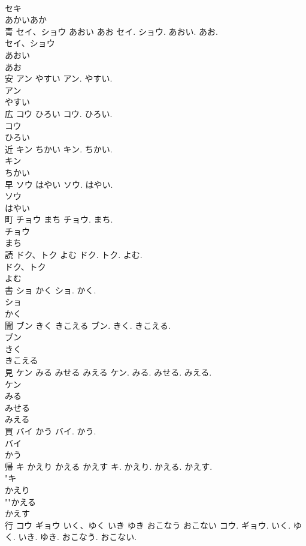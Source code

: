 \documentclass[8pt]{extreport}
\begin{document}
\begin{CJK}{UTF8}{min}
\\	セキ
\\	あかいあか
\\	青	セイ、ショウ あおい あお	セイ. ショウ. あおい. あお.	
\\	セイ、ショウ
\\	あおい
\\	あお
\\	安	アン やすい	アン. やすい.	
\\	アン
\\	やすい
\\	広	コウ ひろい	コウ. ひろい.	
\\	コウ
\\	ひろい
\\	近	キン ちかい	キン. ちかい.	
\\	キン
\\	ちかい
\\	早	ソウ はやい	ソウ. はやい.	
\\	ソウ
\\	はやい
\\	町	チョウ まち	チョウ. まち.	
\\	チョウ
\\	まち
\\	読	ドク、トク よむ	ドク. トク. よむ.	
\\	ドク、トク
\\	よむ
\\	書	ショ かく	ショ. かく.	
\\	ショ
\\	かく
\\	聞	ブン きく きこえる	ブン. きく. きこえる.	
\\	ブン
\\	きく
\\	きこえる
\\	見	ケン みる みせる みえる	ケン. みる. みせる. みえる.	
\\	ケン
\\	みる
\\	みせる
\\	みえる
\\	買	バイ かう	バイ. かう.	
\\	バイ
\\	かう
\\	帰	キ かえり かえる かえす	キ. かえり. かえる. かえす.	
\\	"キ
\\	かえり
\\	""かえる
\\	かえす
\\	行	コウ ギョウ いく、ゆく いき ゆき おこなう おこない	コウ. ギョウ. いく. ゆく. いき. ゆき. おこなう. おこない.	

\end{CJK}
\end{document}
